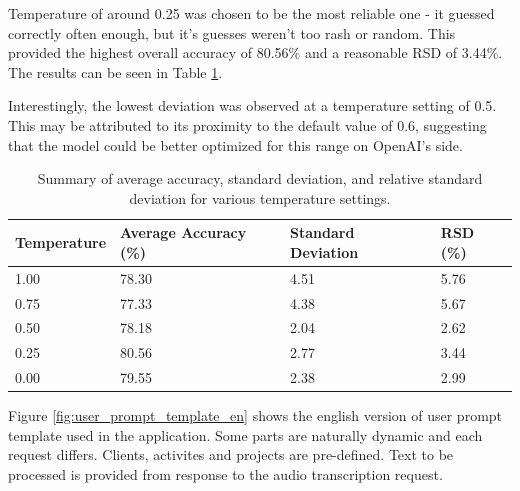 \documentclass[
  digital,     %
  oneside,     %
  nosansbold,  %
  nocolorbold, %
  lof,         %
  lot,         %
]{fithesis4}
\begin{document}
Temperature of around 0.25 was chosen to be the most reliable one - it guessed correctly often enough, but it's guesses weren't too rash or random. This provided the highest overall accuracy of 80.56\% and a reasonable RSD of 3.44\%. The results can be seen in Table \ref{tab:temperature_summary}.

Interestingly, the lowest deviation was observed at a temperature setting of 0.5. This may be attributed to its proximity to the default value of 0.6, suggesting that the model could be better optimized for this range on OpenAI's side.

\begin{table}[h]
  \centering
  \begin{tabularx}{\textwidth}{lXXX}
    \toprule
    \textbf{Temperature} & \textbf{Average Accuracy (\%)} & \textbf{Standard Deviation} & \textbf{RSD (\%)} \\
    \midrule
    1.00  & 78.30 & 4.51 & 5.76 \\
    0.75  & 77.33 & 4.38 & 5.67 \\
    0.50  & 78.18 & 2.04 & 2.62 \\
    0.25  & 80.56 & 2.77 & 3.44 \\
    0.00  & 79.55 & 2.38 & 2.99 \\
    \bottomrule
  \end{tabularx}
  \caption{Summary of average accuracy, standard deviation, and relative standard deviation for various temperature settings.}
  \label{tab:temperature_summary}
\end{table}

Figure \ref{fig:user_prompt_template_en} shows the english version of user prompt template used in the application. Some parts are naturally dynamic and each request differs. Clients, activites and projects are pre-defined. Text to be processed is provided from response to the audio transcription request.
\end{document}
